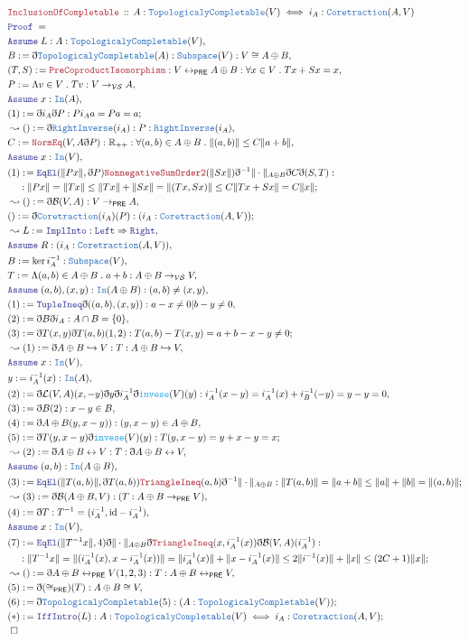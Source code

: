 \documentclass[12pt]{scrartcl}
\newcommand{\TYPE}[1]{\textcolor{NavyBlue}{\mathtt{#1}}}
\newcommand{\FUNC}[1]{\textcolor{Cerulean}{\mathtt{#1}}}
\newcommand{\LOGIC}[1]{\textcolor{Blue}{\mathtt{#1}}}
\newcommand{\THM}[1]{\textcolor{Maroon}{\mathtt{#1}}}
\renewcommand{\.}{\; . \;}
\newcommand{\de}{: \kern 0.1pc =}
\newcommand{\Theorem}[2]{& \THM{#1} \, :: \, #2 \\ & \Proof = \\ }
\newcommand{\NewLine}{\\ & \kern 1pc}
\newcommand{\Page}[1]{\begin{align*} #1 \end{align*} \newpage   }
\newcommand{ \bd }{ \ByDef }
\newcommand{\Reals}{\mathbb{R} }
\newcommand{\ToInj}{\hookrightarrow}
\newcommand{\ToBij}{\leftrightarrow}
\newcommand{\Say}[3]{& #1 \de #2 : #3, \\}
\newcommand{\Conclude}[3]{& #1 \de #2 : #3; \\}
\newcommand{\Derive}[3]{& \leadsto #1 \de #2 : #3, \\}
\newcommand{\A}{\LOGIC{Assume} \;}
\newcommand{\Assume}[2]{& \A #1 : #2, \\}
\newcommand{\QED}{\; \square}
\newcommand{\EndProof}{& \QED \\}
\newcommand{\ByDef}{\eth}
\newcommand{\Proof}{\LOGIC{Proof} \; }
\newcommand{\PRE}{\mathsf{PRE}} %
\newcommand{\B}{\mathcal{B}}
\begin{document}
\Page{ 
 \Theorem{InclusionOfCompletable}{ A :  \TYPE{TopologicalyCompletable}(V) \iff i_A : \TYPE{Coretraction}(A,V) }
\Assume{L}{A :  \TYPE{TopologicalyCompletable}(V)}
\Say{B}{\bd \TYPE{TopologicalyCompletable}(A) }{ \TYPE{Subspace}(V) : V \cong A \oplus B }
\Say{(T,S)}{\THM{PreCoproductIsomorphism}}{ V \ToBij_\PRE A \oplus B : \forall x \in V \. Tx + Sx = x }
\Say{P}{ \Lambda v \in V \. Tv   }{ V \to_{\mathcal{VS}}  A}
\Assume{x}{\TYPE{In}(A)}
\Conclude{(1)}{ \bd i_A \bd P}{ P i_A a  = Pa = a}
\Derive{()}{ \bd \TYPE{RightInverse}(i_A)}{ P : \TYPE{RightInverse}(i_A)  }
\Say{C}{\THM{NormEq}(V,A \bd P)}{ \Reals_{++} : \forall (a,b) \in A \oplus B \. \| (a,b) \| \le C \| a + b \| }
\Assume{ x }{\TYPE{In}(V)} 
\Conclude{(1)}{ \LOGIC{EqEl}(\| Px \|, \bd P) \THM{NonnegativeSumOrder2}(\|Sx\|)\bd^{-1}\| \cdot \|_{A \oplus B} \bd C \bd (S,T) : \NewLine
}{ \| Px \| = \| Tx \| \le \| Tx \|  + \| Sx \| 
 = \| (Tx, Sx) \|
\le C\| Tx + Sx \| = C\| x \| }
\Derive{()}{ \bd\B(V,A) }{ V \to_{\PRE} A}
\Conclude{()}{\bd \TYPE{Coretraction}(i_A)(P)}{(i_A : \TYPE{Coretraction}(A,V))}
\Derive{L}{\LOGIC{ImplInto}}{ \LOGIC{Left} \Rightarrow \LOGIC{Right} }
 \Assume{R}{ (i_A : \TYPE{Coretraction}(A,V) ) }
 \Say{B}{\ker i_A^{-1}}{ \TYPE{Subspace}(V) }
 \Say{T}{ \Lambda (a,b) \in A \oplus B \. a + b }{ A \oplus B \to_{\mathcal{VS}} V  }
 \Assume{(a,b),(x,y)}{ \TYPE{In}(A \oplus B) : (a,b) \neq (x,y)}
 \Say{(1)}{ \LOGIC{TupleIneq}{\bd ((a,b),(x,y))} }{ a - x \neq 0 | b - y \neq 0 }
 \Say{(2)}{ \bd B \bd i_A }{ A \cap B = \{ 0 \} }
 \Conclude{(3)}{  \bd T (x,y)\bd T(a,b) (1,2)   }{ T(a,b) - T(x,y) = a + b - x - y \neq 0  }
 \Derive{(1)}{\bd A \oplus B \ToInj V}{ T :   A \oplus B \ToInj V}
 \Assume{x}{\TYPE{In}(V)}
 \Say{y}{ i_A^{-1}(x) }{\TYPE{In}(A)}
 \Say{(2)}{ \bd \mathcal{L}(V,A)(x,-y) \bd y \bd i^{-1}_A \bd \FUNC{invese}(V)(y) }{ i_A^{-1}(x -y) = i_A^{-1}(x) + i_B^{-1}( -y) = y - y = 0  }
 \Say{(3)}{ \bd B (2) }{ x - y \in B }
 \Say{ (4)  }{\bd A \oplus B(y,x -y))}{ (y,x - y) \in A \oplus B }
 \Conclude{ (5) }{ \bd T(y, x -y)\bd \FUNC{invese}(V)(y)}{ T(y, x - y) = y + x -y = x }
 \Derive{ (2) }{ \bd A \oplus B \ToBij V}{ T : \bd A \oplus B \ToBij V }
 \Assume{ (a,b) }{ \TYPE{In}( A \oplus B )   }
 \Conclude{ (3) }{ \LOGIC{EqEl}(\| T(a,b) \|, \bd T(a,b) )\THM{TriangleIneq}(a,b)\bd^{-1} 
 \| \cdot \|_{ A \oplus B } }
 {  \| T(a,b) \| = \|  a + b  \| \le \| a \| + \| b \| = \|(a,b)\| }
 \Derive{ (3) }{ \bd \B(A \oplus B, V) }{ (T : A \oplus B \to_\PRE   V )} 
 \Say{(4)}{ \bd T }{ T^{-1} = (i^{-1}_A, \mathrm{id} - i^{-1}_A)}
 \Assume{x}{\TYPE{In}(V)}
 \Conclude{(7)}{  \LOGIC{EqEl}( \| T^{-1}x \| , 4  ) \bd \| \cdot \|_{A \oplus B} 
  \bd \THM{TriangleIneq}(x, i^{-1}_A(x) ) \bd \B(V,A)(i^{-1}_A)}
 {  \NewLine : \| T^{-1}x \| = \| (i^{-1}_A(x),x - i^{-1}_A(x)) \| = \| i^{-1}_A(x) \| + \| 
  x - i^{-1}_A(x) \| \le    2\| i^{-1}(x) \| + \| x \| \le  (2C + 1)\| x\|}
 \Derive{()}{\bd A \oplus B \ToBij_\PRE  V (1,2,3)}{ T : A \oplus B \ToBij_\PRE  V} 
 \Say{(5)}{\bd (\cong_\PRE)(T)}{ A \oplus B \cong V}
 \Conclude{(6)}{ \bd \TYPE{TopologicalyCompletable}(5)   }{(A : \TYPE{TopologicalyCompletable}(V))} 
 \Conclude{(*)}{ \LOGIC{IffIntro}(L)}
 { A :  \TYPE{TopologicalyCompletable}(V) \iff i_A : \TYPE{Coretraction}(A,V) }
 \EndProof
 }
\end{document}
